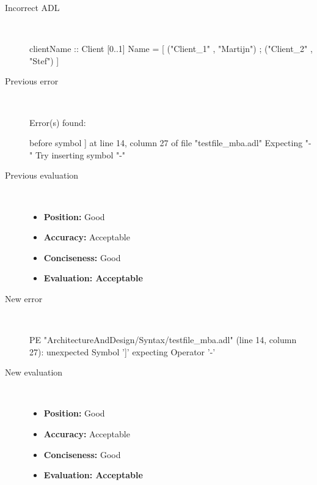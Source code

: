 \begin{description}
  \item[Incorrect ADL]~\\
\begin{adl}
clientName :: Client [0..1] Name =
    [ ("Client_1"      , "Martijn")
    ; ("Client_2"      , "Stef")
    ]\end{adl}
  \item[Previous error]~\\
\begin{haskell}
Error(s) found:

before symbol ] at line 14, column 27 of file "testfile_mba.adl"
Expecting "-"
Try inserting symbol "-"
\end{haskell}
  \item[Previous evaluation]~\\
    \begin{itemize}
    \item \textbf{Position:} Good
    \item \textbf{Accuracy:} Acceptable
    \item \textbf{Conciseness:} Good
    \item \textbf{Evaluation: Acceptable}
    \end{itemize}
  \item[New error]~\\
\begin{haskell}
PE "ArchitectureAndDesign/Syntax/testfile_mba.adl" (line 14, column 27):
unexpected Symbol ']'
expecting Operator '-'\end{haskell}
  \item[New evaluation]~\\
    \begin{itemize}
    \item \textbf{Position:} Good
    \item \textbf{Accuracy:} Acceptable
    \item \textbf{Conciseness:} Good
    \item \textbf{Evaluation: Acceptable}
    \end{itemize}
  \end{description}

\hrulefill

